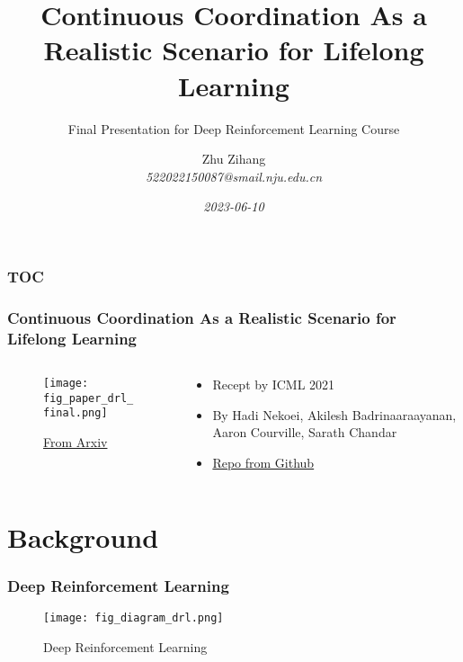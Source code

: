 \documentclass{njupre/njupre}
\title[title]{ Continuous Coordination As a Realistic Scenario for Lifelong Learning}
\subtitle{Final Presentation for Deep Reinforcement Learning Course}
\author[Zhu Zihang]{\texorpdfstring{Zhu Zihang \\ \smallskip \textit{522022150087@smail.nju.edu.cn}}{}}
\date[2023-06-10]{\textit{2023-06-10}}
\begin{document}
\begin{frame}
    \titlepage
\end{frame}

\begin{frame}
    \frametitle{TOC}
    \tableofcontents
\end{frame}

\begin{frame}
    \frametitle{Continuous Coordination As a Realistic Scenario for Lifelong Learning \cite{nekoeiContinuousCoordinationRealistic2021}}
    \begin{columns}[c] %
        \begin{column}{0.3\textwidth} %
            \begin{figure}
                \texttt{[image: fig\_paper\_drl\_final.png]}
                \caption{\href{https://arxiv.org/pdf/2103.03216.pdf}{From Arxiv}}
            \end{figure}
        \end{column}
        \begin{column}{0.68\textwidth} %
            \begin{itemize}
                \item Recept by ICML 2021
                \item By Hadi Nekoei, Akilesh Badrinaaraayanan, Aaron Courville, Sarath Chandar
                \item \href{https://github.com/chandar-lab/Lifelong-Hanabi}{Repo from Github}
            \end{itemize}
        \end{column}
    \end{columns}
\end{frame}

\section{Background}

\begin{frame}
    \frametitle{Deep Reinforcement Learning}
    \begin{figure}
        \texttt{[image: fig\_diagram\_drl.png]}
        \caption[short]{Deep Reinforcement Learning}
    \end{figure}
\end{frame}
\end{document}
